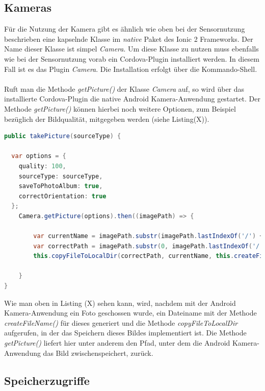 \subsection{Kameras}

Für die Nutzung der Kamera gibt es ähnlich wie oben bei der Sensornutzung beschrieben eine kapselnde Klasse im \textit{native} Paket des Ionic 2 Frameworks. Der Name dieser Klasse ist simpel \textit{Camera}. Um diese Klasse zu nutzen muss ebenfalls wie bei der Sensornutzung vorab ein Cordova-Plugin installiert werden. In diesem Fall ist es das Plugin \textit{Camera}. Die Installation erfolgt über die Kommando-Shell. 
\\
\\
Ruft man die Methode \textit{getPicture()} der Klasse \textit{Camera} auf, so wird über das installierte Cordova-Plugin die native Android Kamera-Anwendung gestartet. Der Methode \textit{getPicture()} können hierbei noch weitere Optionen, zum Beispiel bezüglich der Bildqualität, mitgegeben werden (siehe Listing(X)). 

\begin{lstlisting}[caption=Aufruf der Android Kamera-Anwendung über die Methode \textit{getPicture()}, label=lst:CameraIonic, language=Java]
public takePicture(sourceType) {
  
  var options = {
    quality: 100,
    sourceType: sourceType,
    saveToPhotoAlbum: true,
    correctOrientation: true
  };
	Camera.getPicture(options).then((imagePath) => {
      
        var currentName = imagePath.substr(imagePath.lastIndexOf('/') + 1);
        var correctPath = imagePath.substr(0, imagePath.lastIndexOf('/') + 1);
        this.copyFileToLocalDir(correctPath, currentName, this.createFileName());
      
    }
}
\end{lstlisting}

Wie man oben in Listing (X) sehen kann, wird, nachdem mit der Android Kamera-Anwendung ein Foto geschossen wurde, ein Dateiname mit der Methode \textit{createFileName()} für dieses generiert und die Methode \textit{copyFileToLocalDir} aufgerufen, in der das Speichern dieses Bildes implementiert ist. Die Methode \textit{getPicture()} liefert hier unter anderem den Pfad, unter dem die Android Kamera-Anwendung das Bild zwischenspeichert, zurück.

\subsection{Speicherzugriffe}

